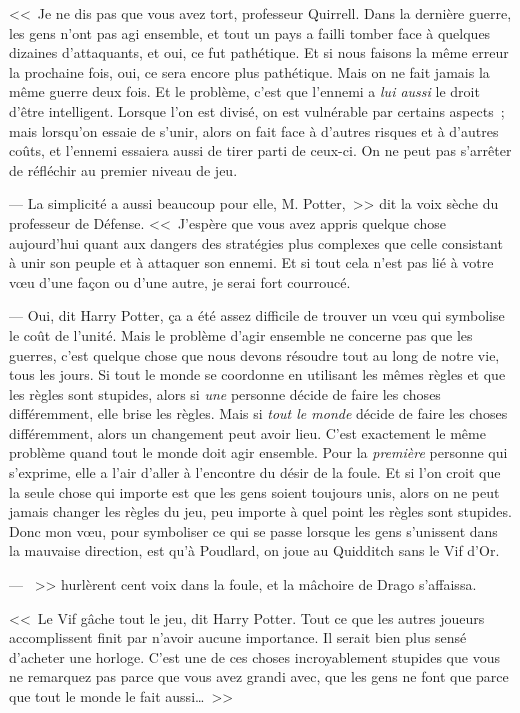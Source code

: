 <<~Je ne dis pas que vous avez tort, professeur Quirrell. Dans la dernière guerre, les gens n'ont pas agi ensemble, et tout un pays a failli tomber face à quelques dizaines d'attaquants, et oui, ce fut pathétique. Et si nous faisons la même erreur la prochaine fois, oui, ce sera encore plus pathétique. Mais on ne fait jamais la même guerre deux fois. Et le problème, c'est que l'ennemi a \emph{lui aussi} le droit d'être intelligent. Lorsque l'on est divisé, on est vulnérable par certains aspects~; mais lorsqu'on essaie de s'unir, alors on fait face à d'autres risques et à d'autres coûts, et l'ennemi essaiera aussi de tirer parti de ceux-ci. On ne peut pas s'arrêter de réfléchir au premier niveau de jeu.

--- La simplicité a aussi beaucoup pour elle, M. Potter,~>> dit la voix sèche du professeur de Défense. <<~J'espère que vous avez appris quelque chose aujourd'hui quant aux dangers des stratégies plus complexes que celle consistant à unir son peuple et à attaquer son ennemi. Et si tout cela n'est pas lié à votre vœu d'une façon ou d'une autre, je serai fort courroucé.

--- Oui, dit Harry Potter, ça a été assez difficile de trouver un vœu qui symbolise le coût de l'unité. Mais le problème d'agir ensemble ne concerne pas que les guerres, c'est quelque chose que nous devons résoudre tout au long de notre vie, tous les jours. Si tout le monde se coordonne en utilisant les mêmes règles et que les règles sont stupides, alors si \emph{une} personne décide de faire les choses différemment, elle brise les règles. Mais si \emph{tout le monde} décide de faire les choses différemment, alors un changement peut avoir lieu. C'est exactement le même problème quand tout le monde doit agir ensemble. Pour la \emph{première} personne qui s'exprime, elle a l'air d'aller à l'encontre du désir de la foule. Et si l'on croit que la seule chose qui importe est que les gens soient toujours unis, alors on ne peut jamais changer les règles du jeu, peu importe à quel point les règles sont stupides. Donc mon vœu, pour symboliser ce qui se passe lorsque les gens s'unissent dans la mauvaise direction, est qu'à Poudlard, on joue au Quidditch sans le Vif d'Or.

--- ~>> hurlèrent cent voix dans la foule, et la mâchoire de Drago s'affaissa.

<<~Le Vif gâche tout le jeu, dit Harry Potter. Tout ce que les autres joueurs accomplissent finit par n'avoir aucune importance. Il serait bien plus sensé d'acheter une horloge. C'est une de ces choses incroyablement stupides que vous ne remarquez pas parce que vous avez grandi avec, que les gens ne font que parce que tout le monde le fait aussi…~>>

